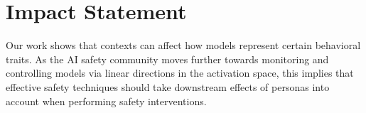 \documentclass{article}
\theoremstyle{plain}
\theoremstyle{definition}
\theoremstyle{remark}
\begin{document}
\section{Impact Statement}
\label{sec:impactstatement}

Our work shows that contexts can affect how models represent certain behavioral traits. As the AI safety community moves further towards monitoring and controlling models via linear directions in the activation space, this implies that effective safety techniques should take downstream effects of personas into account when performing safety interventions.
\end{document}
